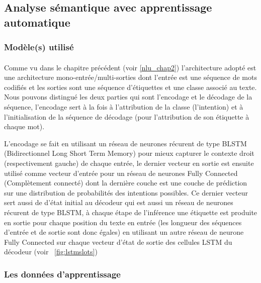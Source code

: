 	\subsection{Analyse sémantique avec apprentissage automatique}
		\subsubsection{Modèle(s) utilisé}
		\paragraph{}\label{joint_model}
		Comme vu dans le chapitre précédent (voir \ref{nlu_chap2}) l'architecture adopté est une architecture mono-entrée/multi-sorties dont l'entrée est une séquence de mots codifiés et les sorties sont une séquence d'étiquettes et une classe associé au texte. Nous pouvons distingué les deux parties qui sont l'encodage et le décodage de la séquence, l'encodage sert à la fois à l'attribution de la classe (l'intention) et à l'initialisation de la séquence de décodage (pour l'attribution de son étiquette à chaque mot).
		\par
		L'encodage se fait en utilisant un réseau de neurones récurent de type BLSTM (Bidirectionnel Long Short Term Memory) pour mieux capturer le contexte droit (respectivement gauche) de chaque entrée, le dernier vecteur en sortie est ensuite utilisé comme vecteur d'entrée pour un réseau de neurones Fully Connected (Complètement connecté) dont la dernière couche est une couche de prédiction sur une distribution de probabilités des intentions possibles. Ce dernier vecteur sert aussi de d'état initial au décodeur qui est aussi un réseau de neurones récurent de type BLSTM, à chaque étape de l'inférence une étiquette est produite en sortie pour chaque position du texte en entrée (les longueur des séquences d'entrée et de sortie sont donc égales) en utilisant un autre réseau de neurone Fully Connected sur chaque vecteur d'état de sortie des cellules LSTM du décodeur (voir ~\ref{fig:lstmslots})
		\subsubsection{Les données d'apprentissage}

